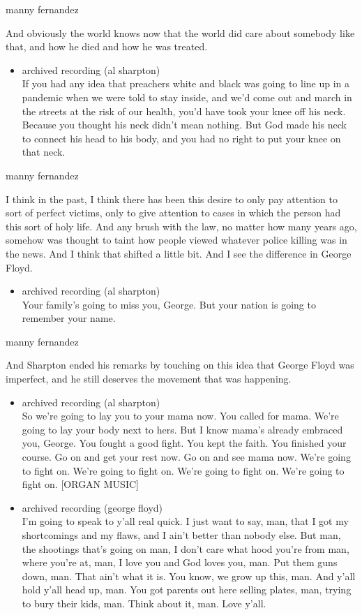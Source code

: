 manny fernandez

And obviously the world knows now that the world did care about somebody
like that, and how he died and how he was treated.

\begin{itemize}
\tightlist
\item
  archived recording (al sharpton)\\
  If you had any idea that preachers white and black was going to line
  up in a pandemic when we were told to stay inside, and we'd come out
  and march in the streets at the risk of our health, you'd have took
  your knee off his neck. Because you thought his neck didn't mean
  nothing. But God made his neck to connect his head to his body, and
  you had no right to put your knee on that neck.
\end{itemize}

manny fernandez

I think in the past, I think there has been this desire to only pay
attention to sort of perfect victims, only to give attention to cases in
which the person had this sort of holy life. And any brush with the law,
no matter how many years ago, somehow was thought to taint how people
viewed whatever police killing was in the news. And I think that shifted
a little bit. And I see the difference in George Floyd.

\begin{itemize}
\tightlist
\item
  archived recording (al sharpton)\\
  Your family's going to miss you, George. But your nation is going to
  remember your name.
\end{itemize}

manny fernandez

And Sharpton ended his remarks by touching on this idea that George
Floyd was imperfect, and he still deserves the movement that was
happening.

\begin{itemize}
\item
  archived recording (al sharpton)\\
  So we're going to lay you to your mama now. You called for mama. We're
  going to lay your body next to hers. But I know mama's already
  embraced you, George. You fought a good fight. You kept the faith. You
  finished your course. Go on and get your rest now. Go on and see mama
  now. We're going to fight on. We're going to fight on. We're going to
  fight on. We're going to fight on. {[}ORGAN MUSIC{]}
\item
  archived recording (george floyd)\\
  I'm going to speak to y'all real quick. I just want to say, man, that
  I got my shortcomings and my flaws, and I ain't better than nobody
  else. But man, the shootings that's going on man, I don't care what
  hood you're from man, where you're at, man, I love you and God loves
  you, man. Put them guns down, man. That ain't what it is. You know, we
  grow up this, man. And y'all hold y'all head up, man. You got parents
  out here selling plates, man, trying to bury their kids, man. Think
  about it, man. Love y'all.
\end{itemize}

